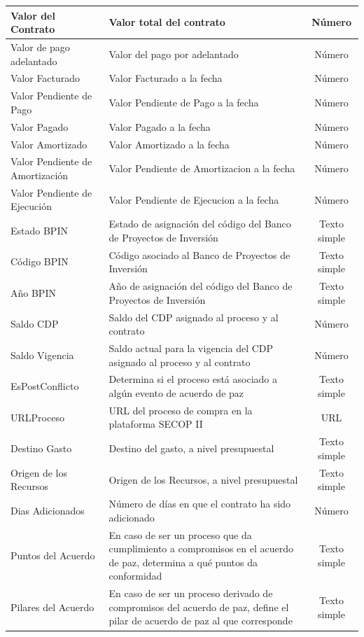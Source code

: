 \documentclass[11pt,letterpaper,oneside]{article}
\begin{document}
\begin{table}[!htp]
\begin{tabular}{|p{3cm}|p{6.5cm}|c|}
		\hline
		Valor del Contrato & Valor total del contrato & Número \\
		\hline
		Valor de pago adelantado & Valor del pago por adelantado & Número \\
		\hline
		Valor Facturado & Valor Facturado a la fecha & Número \\
		\hline
		Valor Pendiente de Pago & Valor Pendiente de Pago a la fecha & Número \\
		\hline
		Valor Pagado & Valor Pagado a la fecha & Número \\
		\hline
		Valor Amortizado & Valor Amortizado a la fecha & Número \\
		\hline
		Valor Pendiente de Amortización & Valor Pendiente de Amortizacion a la fecha & Número \\
		\hline
		Valor Pendiente de Ejecución & Valor Pendiente de Ejecucion a la fecha & Número  \\
		\hline
		Estado BPIN & Estado de asignación del código del Banco de Proyectos de Inversión & Texto simple \\
		\hline
		Código BPIN & Código asociado al Banco de Proyectos de Inversión & Texto simple \\
		\hline
		Año BPIN & Año de asignación del código del Banco de Proyectos de Inversión & Texto simple \\
		\hline
		Saldo CDP & Saldo del CDP asignado al proceso y al contrato & Número \\
		\hline
		Saldo Vigencia & Saldo actual para la vigencia del CDP asignado al proceso y al contrato & Número \\
		\hline
		EsPostConflicto & Determina si el proceso está asociado a algún evento de acuerdo de paz & Texto simple \\
		\hline
		URLProceso & URL del proceso de compra en la plataforma SECOP II & URL \\
		\hline
		Destino Gasto & Destino del gasto, a nivel presupuestal & Texto simple  \\
		\hline
		Origen de los Recursos & Origen de los Recursos, a nivel presupuestal & Texto simple \\
		\hline
		Dias Adicionados & Número de días en que el contrato ha sido adicionado & Número \\
		\hline
		Puntos del Acuerdo & En caso de ser un proceso que da cumplimiento a compromisos en el acuerdo de paz, determina a qué puntos da conformidad & Texto simple \\
		\hline
		Pilares del Acuerdo & En caso de ser un proceso derivado de compromisos del acuerdo de paz, define el pilar de acuerdo de paz al que corresponde & Texto simple \\

\end{tabular}
\end{table}
\end{document}
